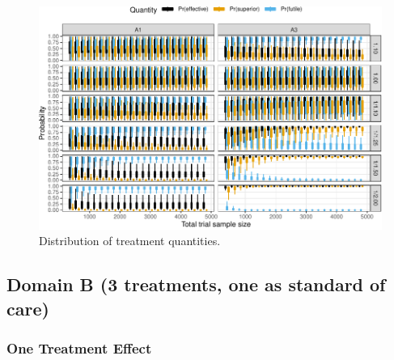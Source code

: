 \documentclass[
]{article}
\begin{document}
\begin{figure}
\centering
\includegraphics{ASCOT_simulations_5_files/figure-latex/unnamed-chunk-7-1.pdf}
\caption{\label{fig:unnamed-chunk-7}Distribution of treatment quantities.}
\end{figure}

\clearpage

\hypertarget{domain-b-3-treatments-one-as-standard-of-care}{%
\subsection{Domain B (3 treatments, one as standard of care)}\label{domain-b-3-treatments-one-as-standard-of-care}}

\hypertarget{one-treatment-effect-1}{%
\subsubsection{One Treatment Effect}\label{one-treatment-effect-1}}
\end{document}
